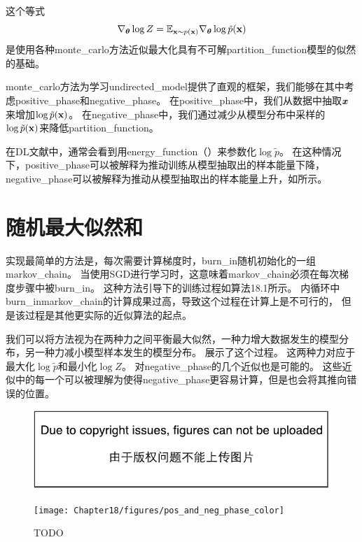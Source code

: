 这个等式
\begin{equation}
\label{eq:18.15}
	\nabla_{\boldsymbol{\theta}} \log Z = \mathbb{E}_{\mathbf{x} \sim p(\mathbf{x})} \nabla_{\boldsymbol{\theta}} \log \tilde{p}(\mathbf{x})
\end{equation}
是使用各种\gls{monte_carlo}方法近似最大化具有不可解\gls{partition_function}模型的似然的基础。


\gls{monte_carlo}方法为学习\gls{undirected_model}提供了直观的框架，我们能够在其中考虑\gls{positive_phase}和\gls{negative_phase}。
在\gls{positive_phase}中，我们从数据中抽取$\boldsymbol{\mathit{x}}$来增加$\log \tilde{p}(\mathbf{x})$。
在\gls{negative_phase}中，我们通过减少从模型分布中采样的$\log \tilde{p}(\mathbf{x})$来降低\gls{partition_function}。


在\gls{DL}文献中，通常会看到用\gls{energy_function}（）来参数化$\log \tilde{p}$。
在这种情况下，\gls{positive_phase}可以被解释为推动训练从模型抽取出的样本能量下降，\gls{negative_phase}可以被解释为推动从模型抽取出的样本能量上升，如所示。


\section{随机最大似然和}
\label{sec:stochastic_maximum_likelihood_and_contrastive_divergence}
实现最简单的方法是，每次需要计算梯度时，\gls{burn_in}随机初始化的一组\gls{markov_chain}。
当使用\gls{SGD}进行学习时，这意味着\gls{markov_chain}必须在每次梯度步骤中被\gls{burn_in}。
这种方法引导下的训练过程如算法18.1所示。
内循环中\gls{burn_in}\gls{markov_chain}的计算成果过高，导致这个过程在计算上是不可行的，
但是该过程是其他更实际的近似算法的起点。


我们可以将方法视为在两种力之间平衡最大似然，一种力增大数据发生的模型分布，另一种力减小模型样本发生的模型分布。
展示了这个过程。
这两种力对应于最大化$\log \tilde{p}$和最小化$\log Z$。
对\gls{negative_phase}的几个近似也是可能的。
这些近似中的每一个可以被理解为使得\gls{negative_phase}更容易计算，但是也会将其推向错误的位置。

\begin{figure}[!htb]
\ifOpenSource
\centerline{\includegraphics{figure.pdf}}
\else
\centerline{\texttt{[image: Chapter18/figures/pos\_and\_neg\_phase\_color]}}
\fi
\caption{TODO}
\label{fig:chap18_pos_and_neg_phase}
\end{figure}

